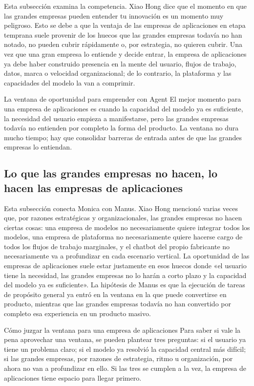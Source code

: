 \documentclass[a4paper]{article}
\begin{document}
Esta subsección examina la competencia. Xiao Hong dice que el momento en que las grandes empresas pueden entender tu innovación es un momento muy peligroso. Esto se debe a que la ventaja de las empresas de aplicaciones en etapa temprana suele provenir de los huecos que las grandes empresas todavía no han notado, no pueden cubrir rápidamente o, por estrategia, no quieren cubrir. Una vez que una gran empresa lo entiende y decide entrar, la empresa de aplicaciones ya debe haber construido presencia en la mente del usuario, flujos de trabajo, datos, marca o velocidad organizacional; de lo contrario, la plataforma y las capacidades del modelo la van a comprimir.

\begin{importantbox}{La ventana de oportunidad para emprender con Agent}
El mejor momento para una empresa de aplicaciones es cuando la capacidad del modelo ya es suficiente, la necesidad del usuario empieza a manifestarse, pero las grandes empresas todavía no entienden por completo la forma del producto. La ventana no dura mucho tiempo; hay que consolidar barreras de entrada antes de que las grandes empresas lo entiendan.
\end{importantbox}

\subsection{Lo que las grandes empresas no hacen, lo hacen las empresas de aplicaciones}

Esta subsección conecta Monica con Manus. Xiao Hong mencionó varias veces que, por razones estratégicas y organizacionales, las grandes empresas no hacen ciertas cosas: una empresa de modelos no necesariamente quiere integrar todos los modelos, una empresa de plataforma no necesariamente quiere hacerse cargo de todos los flujos de trabajo marginales, y el chatbot del propio fabricante no necesariamente va a profundizar en cada escenario vertical. La oportunidad de las empresas de aplicaciones suele estar justamente en esos huecos donde «el usuario tiene la necesidad, las grandes empresas no lo harán a corto plazo y la capacidad del modelo ya es suficiente». La hipótesis de Manus es que la ejecución de tareas de propósito general ya entró en la ventana en la que puede convertirse en producto, mientras que las grandes empresas todavía no han convertido por completo esa experiencia en un producto masivo.

\begin{importantbox}{Cómo juzgar la ventana para una empresa de aplicaciones}
Para saber si vale la pena aprovechar una ventana, se pueden plantear tres preguntas: si el usuario ya tiene un problema claro; si el modelo ya resolvió la capacidad central más difícil; si las grandes empresas, por razones de estrategia, ritmo u organización, por ahora no van a profundizar en ello. Si las tres se cumplen a la vez, la empresa de aplicaciones tiene espacio para llegar primero.
\end{importantbox}
\end{document}
